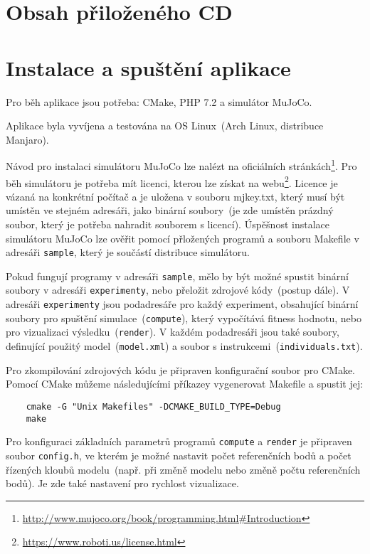 \chapter{Obsah přiloženého CD}

\chapter{Instalace a spuštění aplikace}
Pro běh aplikace jsou potřeba: CMake, PHP 7.2 a simulátor MuJoCo.

Aplikace byla vyvíjena a testována na OS Linux~(Arch Linux, distribuce Manjaro).

Návod pro instalaci simulátoru MuJoCo lze nalézt na oficiálních stránkách\footnote{\url{http://www.mujoco.org/book/programming.html\#Introduction}}.
Pro běh simulátoru je potřeba mít licenci, kterou lze získat na webu\footnote{\url{https://www.roboti.us/license.html}}.
Licence je vázaná na konkrétní počítač a je uložena v souboru mjkey.txt, který musí být umístěn ve stejném adresáři, jako binární soubory~(je zde umístěn prázdný soubor, který je potřeba nahradit souborem s licencí).
Úspěšnost instalace simulátoru MuJoCo lze ověřit pomocí přložených programů a souboru Makefile v adresáři \texttt{sample}, který je součástí distribuce simulátoru.

Pokud fungují programy v adresáři \texttt{sample}, mělo by být možné spustit binární soubory v adresáři \texttt{experimenty}, nebo přeložit zdrojové kódy~(postup dále).
V adresáři \texttt{experimenty} jsou podadresáře pro každý experiment, obsahující binární soubory pro spuštění simulace~(\texttt{compute}), který vypočítává fitness hodnotu, nebo pro vizualizaci výsledku~(\texttt{render}).
V každém podadresáři jsou také soubory, definující použitý model~(\texttt{model.xml}) a soubor s instrukcemi~(\texttt{individuals.txt}).

Pro zkompilování zdrojových kódu je připraven konfigurační soubor pro CMake.
Pomocí CMake můžeme následujícími příkazey vygenerovat Makefile a spustit jej:
\begin{verbatim}
    cmake -G "Unix Makefiles" -DCMAKE_BUILD_TYPE=Debug
    make
\end{verbatim}

Pro konfiguraci základních parametrů programů \texttt{compute} a \texttt{render} je připraven soubor \texttt{config.h}, ve kterém je možné nastavit počet referenčních bodů a počet řízených kloubů modelu~(např. při změně modelu nebo změně počtu referenčních bodů).
Je zde také nastavení pro rychlost vizualizace.


